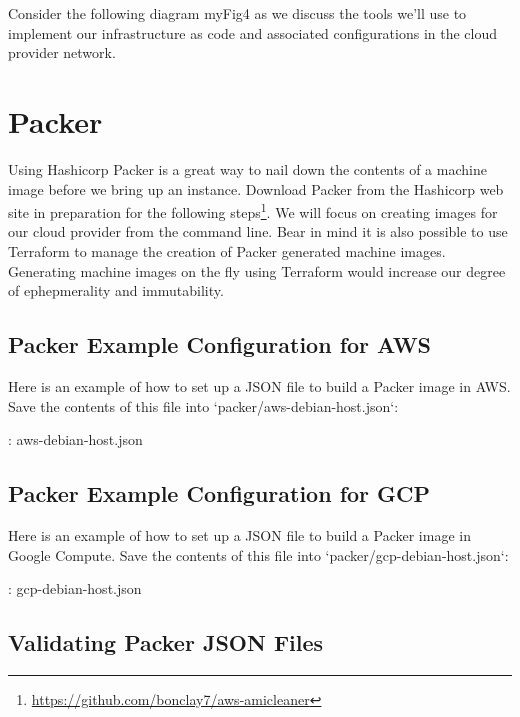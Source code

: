 Consider the following diagram {myFig4} as we discuss the tools we'll
use to implement our infrastructure as code and associated
configurations in the cloud provider network.

\section{Packer}

\justify
Using Hashicorp Packer is a great way to nail down the contents of a
machine image before we bring up an instance. Download Packer from the
Hashicorp web site in preparation for the following steps\footnote{\url{https://github.com/bonclay7/aws-amicleaner}}. 
We will focus on creating images for our cloud provider from the
command line. Bear in mind it is also possible to use Terraform to
manage the creation of Packer generated machine images. Generating
machine images on the fly using Terraform would increase our degree of
ephepmerality and immutability.

\subsection{Packer Example Configuration for AWS}

Here is an example of how to set up a JSON file to build a Packer image
in AWS. Save the contents of this file into
`packer/aws-debian-host.json`:

\justify
\begin{mybox}{\thetcbcounter: aws-debian-host.json}
	
\end{mybox}

\subsection{Packer Example Configuration for GCP}

\justify
Here is an example of how to set up a JSON file to build a Packer image
in Google Compute. Save the contents of this file into
`packer/gcp-debian-host.json`:

\justify
\begin{mybox}{\thetcbcounter: gcp-debian-host.json}
	
\end{mybox}


\subsection{Validating Packer JSON Files}

